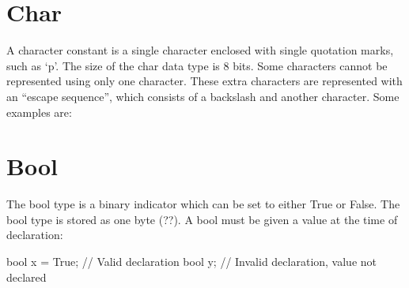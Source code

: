 \begin{homeworkProblem}
	\section{Char}
	
	A character constant is a single character enclosed with single quotation marks, such as ‘p’. The size of the char data type is 8 bits. Some characters cannot be represented using only one character. These extra characters are represented with an “escape sequence”, which consists of a backslash and another character. Some examples are:
	
	
	\section{Bool}
	
	The bool type is a binary indicator which can be set to either True or False. The bool type is stored as one byte (??). A bool must be given a value at the time of declaration:
	
	bool x = True;  // Valid declaration
	bool y;  // Invalid declaration, value not declared
	
	
	
	


\end{homeworkProblem}